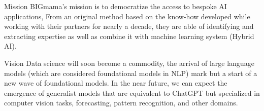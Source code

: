 \documentclass{beamer}
\begin{document}
\begin{frame}
    \begin{block}{Mission}
        BIGmama's mission is to democratize the access to bespoke AI applications, 
        From an original method based on the know-how developed while working with their partners for nearly a decade, 
        they are able of identifying and extracting expertise as well as combine it with machine learning system (Hybrid AI).
    \end{block}

    \begin{block}{Vision}
        Data science will soon become a commodity, the arrival of large language models (which are considered foundational models in NLP) 
        mark but a start of a new wave of foundational models. 
        In the near future, we can expect the emergence of generalist models that are equivalent to ChatGPT but specialized in computer vision tasks, 
        forecasting, pattern recognition, and other domains.
    \end{block}
\end{frame}
\end{document}
